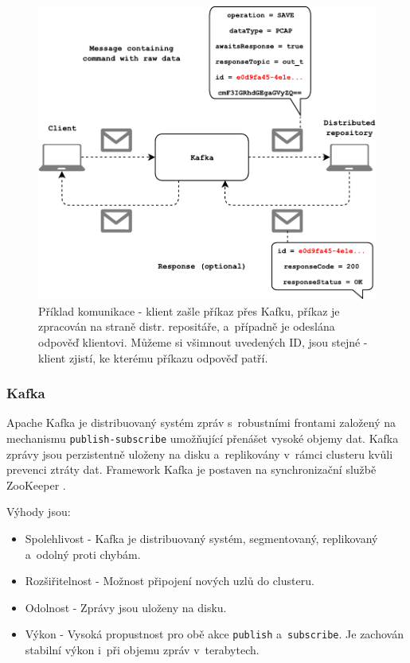 \begin{figure}[!h]
  \centering
  \includegraphics[width=15cm]{template-fig/Kafka_communication.pdf}
  \caption{Příklad komunikace - klient zašle příkaz přes Kafku, příkaz je zpracován na straně distr. repositáře, a~případně je odeslána odpověď klientovi. Můžeme si všimnout uvedených ID, jsou stejné - klient zjistí, ke kterému příkazu odpověď patří.}
  \label{FIG_KafkaCommunication}
\end{figure}

\subsubsection{Kafka}
Apache Kafka je distribuovaný systém zpráv s~robustními frontami založený na mechanismu \texttt{publish-subscribe} umožňující přenášet vysoké objemy dat. Kafka zprávy jsou perzistentně uloženy na disku a~replikovány v~rámci clusteru kvůli prevenci ztráty dat. Framework Kafka je postaven na synchronizační službě ZooKeeper \cite{kafkaTutorialsPoint}.

\vspace{0.5cm}
\noindent Výhody jsou:
\begin{itemize}
    \item Spolehlivost - Kafka je distribuovaný systém, segmentovaný, replikovaný a~odolný proti chybám.
    \item Rozšiřitelnost - Možnost připojení nových uzlů do clusteru.
    \item Odolnost - Zprávy jsou uloženy na disku.
    \item Výkon - Vysoká propustnost pro obě akce \texttt{publish} a~\texttt{subscribe}. Je zachován stabilní výkon i~při objemu zpráv v~terabytech.
\end{itemize}

